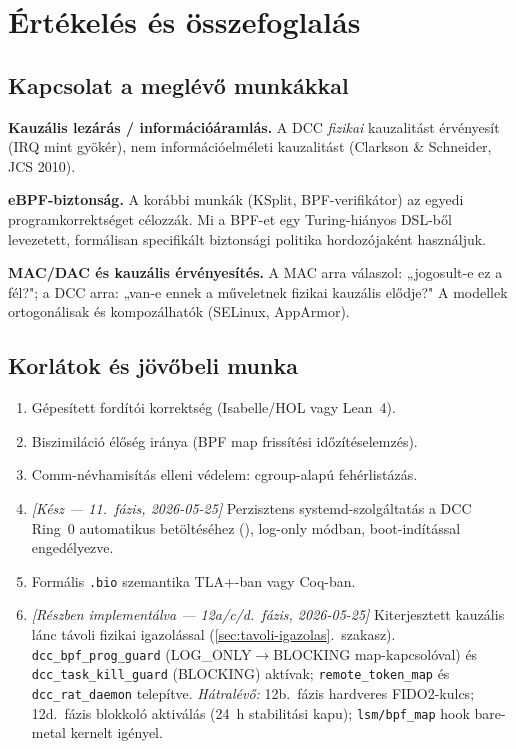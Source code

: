 \documentclass[11pt,a4paper,twoside]{article}
\begin{document}
\section{Értékelés és összefoglalás}

\subsection{Kapcsolat a meglévő munkákkal}

\textbf{Kauzális lezárás / információáramlás.}
A DCC \emph{fizikai} kauzalitást érvényesít (IRQ mint gyökér), nem
információelméleti kauzalitást (Clarkson \& Schneider, JCS 2010).

\textbf{eBPF-biztonság.}
A korábbi munkák (KSplit, BPF-verifikátor) az egyedi programkorrektséget célozzák.
Mi a BPF-et egy Turing-hiányos DSL-ből levezetett, formálisan specifikált
biztonsági politika hordozójaként használjuk.

\textbf{MAC/DAC és kauzális érvényesítés.}
A MAC arra válaszol: „jogosult-e ez a fél?"; a DCC arra: „van-e ennek a
műveletnek fizikai kauzális elődje?" A modellek ortogonálisak és kompozálhatók
(SELinux, AppArmor).

\subsection{Korlátok és jövőbeli munka}
\label{sec:korlatok}

\begin{enumerate}[topsep=2pt,itemsep=2pt]
  \item Gépesített fordítói korrektség (Isabelle/HOL vagy Lean~4).
  \item Biszimiláció élőség iránya (BPF map frissítési időzítéselemzés).
  \item Comm-névhamisítás elleni védelem: cgroup-alapú fehérlistázás.
  \item \textit{[Kész --- 11.\ fázis, 2026-05-25]} Perzisztens systemd-szolgáltatás
        a DCC Ring~0 automatikus betöltéséhez (),
        log-only módban, boot-indítással engedélyezve.
  \item Formális \texttt{.bio} szemantika TLA+-ban vagy Coq-ban.
  \item \textit{[Részben implementálva --- 12a/c/d.\ fázis, 2026-05-25]}
        Kiterjesztett kauzális lánc távoli fizikai igazolással
        (\ref{sec:tavoli-igazolas}.\ szakasz).
        \texttt{dcc\_bpf\_prog\_guard} (LOG\_ONLY$\to$BLOCKING map-kapcsolóval)
        és \texttt{dcc\_task\_kill\_guard} (BLOCKING) aktívak;
        \texttt{remote\_token\_map} és \texttt{dcc\_rat\_daemon} telepítve.
        \textit{Hátralévő:} 12b.\ fázis hardveres FIDO2-kulcs; 12d.\ fázis
        blokkoló aktiválás (24~h stabilitási kapu); \texttt{lsm/bpf\_map}
        hook bare-metal kernelt igényel.
\end{enumerate}
\end{document}
